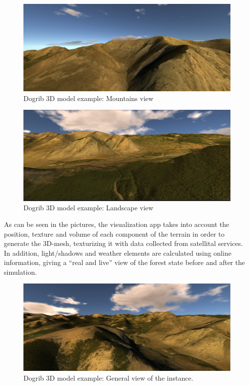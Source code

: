 \documentclass[11pt]{article}
\begin{document}
\begin{figure}[h!]
\centering
\includegraphics[scale=0.4]{Dogrib3D_2.png}
\caption{\label{fig:Dog2}Dogrib 3D model example: Mountains view}
\end{figure}

\begin{figure}[h!]
\centering
\includegraphics[scale=0.4]{Dogrib3D_3.png}
\caption{\label{fig:Dog3}Dogrib 3D model example: Landscape view}
\end{figure}

As can be seen in the pictures, the visualization app takes into account the position, texture and volume of each component of the terrain in order to generate the 3D-mesh, texturizing it with data collected from satellital services. In addition, light/shadows and weather elements are calculated using online information, giving a ``real and live'' view of the forest state before and after the simulation. 

\newpage

\begin{figure}[h!]
\centering
\includegraphics[scale=0.4]{Dogrib3D_4.png}
\caption{\label{fig:Dog4}Dogrib 3D model example: General view of the instance.}
\end{figure}
\end{document}
